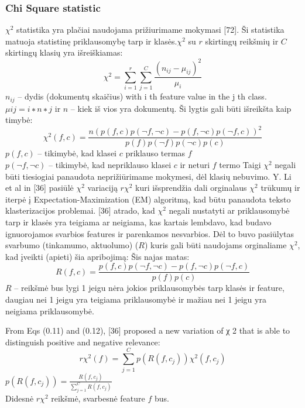 \documentclass{VUMIFInfKursinis}
\begin{document}
		\subsubsection{Chi Square statistic}
			 $\chi^2$ statistika yra plačiai naudojama prižiurimame mokymasi [72]. Ši statistika matuoja statistinę priklausomybę tarp  ir klasės.$\chi^2$ su $r$ skirtingų reikšmių ir $C$ skirtingų klasių yra išreiškiamas:
			\begin{equation}
				\chi^2=\sum _{i=1}^{r}{\sum _{j=1}^{C}{\frac {{(n_{ij}-\mu_{ij})}^{2}}{\mu_{i}}}}
			\end{equation} 
			$n_{ij}$ –  dydis (dokumentų skaičius) with i th feature value in the j th class.\\
			$μ ij = i∗ n ∗j$ ir $n$ – kiek iš vios yra dokumentų.
			Ši lygtis gali būti išreikšta kaip timybė:
			\begin{equation}
				\chi^2(f,c)=\frac{n{(p(f,c)p(\neg f, \neg c) - p(f,\neg c)p(\neg f, c))}^2}{p(f)p(\neg f)p(\neg c)p(c)}
			\end{equation} 
			$p(f,c)$ – tikimybė, kad klasei $c$ priklauso termas $f$\\
			$p(\neg f,\neg c)$ – tikimybė, kad nepriklauso klasei $c$ ir neturi $f$ termo 
			Taigi $\chi^2$ negali būti tiesiogiai panaudota neprižiūrimame mokymesi, dėl klasių nebuvimo. 
			Y. Li et al in [36] pasiūlė $\chi^2$ variaciją $r\chi^2$ kuri išsprendžia dali orginalaus $\chi^2$ trūkumų ir iterpė į Expectation-Maximization (EM) algoritmą, kad būtu panaudota teksto klasterizacijos problemai. [36] atrado, kad $\chi^2$ negali nustatyti ar priklausomybė tarp  ir klasės yra teigiama ar neigiama, kas kartais lembdavo, kad budavo ignuorojamos svarbios features ir parenkamos nesvarbios. Dėl to buvo pasiūlytas svarbumo (tinkamumo, aktuolumo)  ($R$) kuris gali būti naudojams orginaliame $\chi^2$, kad įveikti (apieti) šia apribojimą: Šis najas matas: 
			\begin{equation}
				R(f,c)=\frac{p(f,c)p(\neg f, \neg c) - p(f,\neg c)p(\neg f, c)}{p(f)p(c)} \end{equation} 
			$R$ – reikšmė bus lygi 1 jeigu nėra jokios priklausomybės tarp klasės ir feature, daugiau nei 1 jeigu yra teigiama priklausomybė ir mažiau nei 1 jeigu yra neigiama priklausomybė.

			From Eqs (0.11) and (0.12), [36] proposed a new variation of χ 2 that is able to distinguish positive and negative relevance: 
			\begin{equation}
				r\chi^2(f)=\sum^{C}_{j=1}{p(R(f,c_j))\chi^2(f,c_j)}
			\end{equation} 
			$p(R(f,c_j))=\frac{R(f,c_j)}{\sum^{C}_{j=1}{R(f,c_j)}}$\\
			Didesnė $r\chi^2$ reikšmė, svarbesnė feature $f$ bus.
\end{document}
